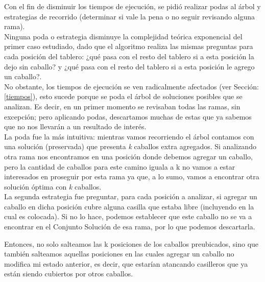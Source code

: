 Con el fin de disminuir los tiempos de ejecuci\'on, se pidi\'o realizar podas al \'arbol y estrategias de recorrido (determinar si vale la pena o no seguir revisando alguna rama).\\

Ninguna poda o estrategia disminuye la complejidad te\'orica exponencial del primer caso estudiado, dado que el algoritmo realiza las mismas preguntas para cada posici\'on del tablero: ¿qu\'e pasa con el resto del tablero si a esta posici\'on la dejo sin caballo? y ¿qu\'e pasa con el resto del tablero si a esta posici\'on le agrego un caballo?.\\

No obstante, los tiempos de ejecuci\'on se ven radicalmente afectados (ver Secci\'on: \ref{tiempos}), esto sucede porque se poda el \'arbol de soluciones posibles que se analizan. Es decir, en un primer momento se revisaban todas las ramas, sin excepci\'on; pero aplicando podas, descartamos muchas de estas que ya sabemos que no nos llevar\'an a un resultado de inter\'es.\\


La poda fue la m\'as intuitiva: mientras vamos recorriendo el \'arbol contamos con una soluci\'on (preservada) que presenta \emph{k} caballos extra agregados. Si analizando otra rama nos encontramos en una posici\'on donde debemos agregar un caballo, pero la cantidad de caballos para este camino iguala a k no vamos a estar interesados en proseguir por esta rama ya que, a lo sumo, vamos a encontrar otra soluci\'on \'optima con \emph{k} caballos.\\


La segunda estrategia fue preguntar, para cada posición a analizar, si agregar un caballo en dicha posici\'on cubre alguna casilla que estaba libre (incluyendo en la cual es colocada). Si no lo hace, podemos establecer que este caballo no se va a encontrar en el Conjunto Solución de esa rama, por lo que podemos descartarla.

Entonces, no solo salteamos las k posiciones de los caballos preubicados, sino que también salteamos aquellas posiciones en las cuales agregar un caballo no modifica mi estado anterior, es decir, que estar\'ian atancando casilleros que ya est\'an siendo cubiertos por otros caballos.
  
